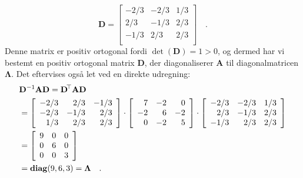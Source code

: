 \begin{example}
\begin{equation}
\mathbf{D}= \left[
          \begin{array}{rrr}
            -2/3 & -2/3 & 1/3 \\
            2/3 & -1/3 & 2/3 \\
            -1/3 & 2/3 & 2/3 \\
          \end{array}
        \right] \quad .
\end{equation}
Denne matrix er positiv ortogonal fordi $\det(\mathbf{D}) = 1 > 0$, og dermed har vi bestemt en positiv ortogonal matrix $\mathbf{D}$, der diagonaliserer $\mathbf{A}$ til diagonalmatricen $\mathbf{\Lambda}$. Det eftervises også let ved en direkte udregning:
\begin{equation}
\begin{aligned}
&\mathbf{D}^{-1} \mathbf{A} \mathbf{D} = \mathbf{D}\hspace*{-.6mm}^{\top} \mathbf{A} \mathbf{D}\\  &= \left[
          \begin{array}{rrr}
            -2/3 & 2/3 & -1/3 \\
            -2/3 & -1/3 & 2/3 \\
            1/3 & 2/3 & 2/3 \\
          \end{array}
        \right] \cdot \left[
               \begin{array}{rrr}
                  7 & -2 & 0 \\
                 -2 & 6 & -2 \\
                 0 & -2 & 5 \\
               \end{array}
             \right] \cdot \left[
          \begin{array}{rrr}
            -2/3 & -2/3 & 1/3 \\
            2/3 & -1/3 & 2/3 \\
            -1/3 & 2/3 & 2/3 \\
          \end{array}
        \right] \\ &=
                                                          \left[
                                                                      \begin{array}{rrr}
                                                                        9 & 0 & 0 \\
                                                                        0 & 6 & 0 \\
                                                                        0 & 0 & 3 \\
                                                                      \end{array}
                                                                    \right] \\
&= \operatorname{\bf{diag}}(9,6,3) = \mathbf{\Lambda} \quad .
\end{aligned}
\end{equation}


\end{example}



